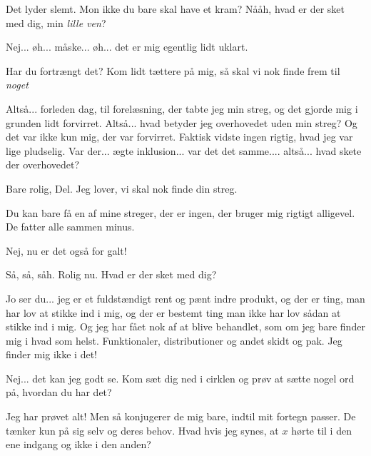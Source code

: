\documentclass[a4paper,11pt]{article}
\begin{document}
\begin{sketch}

 Det lyder slemt. Mon ikke du bare skal have et kram?  Nååh, hvad er der sket med dig, min \textit{lille ven}? 

 Nej... øh... måske... øh... det er mig egentlig lidt uklart.

 Har du fortrængt det? Kom lidt tættere på mig, så skal vi nok finde frem til \emph{noget} 

 Altså... forleden dag, til forelæsning, der tabte jeg min streg, og det gjorde mig i grunden lidt forvirret. Altså... hvad betyder jeg overhovedet uden min streg? Og det var ikke kun mig, der var forvirret. Faktisk vidste ingen rigtig, hvad jeg var lige pludselig. Var der... ægte inklusion... var det det samme.... altså... hvad skete der overhovedet? 

 Bare rolig, Del. Jeg lover, vi skal nok finde din streg.

 Du kan bare få en af mine streger, der er ingen, der bruger mig rigtigt alligevel. De fatter alle sammen minus.



 Nej, nu er det også for galt!

 Så, så, såh. Rolig nu. Hvad er der sket med dig?

 Jo ser du... jeg er et fuldstændigt rent og pænt indre produkt, og der er ting, man har lov at stikke ind i mig, og der er bestemt ting man ikke har lov sådan at stikke ind i mig. Og jeg har fået nok af at blive behandlet, som om jeg bare finder mig i hvad som helst. Funktionaler, distributioner og andet skidt og pak. Jeg finder mig ikke i det!

 Nej... det kan jeg godt se. Kom sæt dig ned i cirklen og prøv at sætte nogel ord på, hvordan du har det?

 Jeg har prøvet alt! Men så konjugerer de mig bare, indtil mit fortegn passer. De tænker kun på sig selv og deres behov. Hvad hvis jeg synes, at $x$ hørte til i den ene indgang og ikke i den anden?


\end{sketch}
\end{document}
